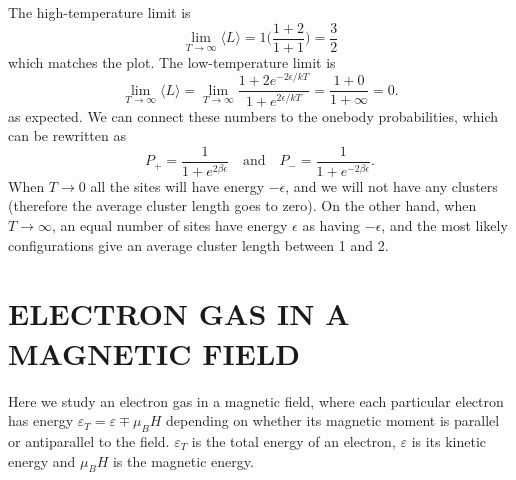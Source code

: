 \documentclass[norsk,a4paper,12pt]{article}
\begin{document}
The high-temperature limit is
\begin{equation}
\lim_{T\rightarrow\infty}\langle L\rangle = 1\bigg(\frac{1+2}{1+1}\bigg)=\frac{3}{2}
\end{equation}
which matches the plot. The low-temperature limit is
\begin{equation}
\lim_{T\rightarrow\infty}\langle L\rangle = \lim_{T\rightarrow\infty} \frac{1+2e^{-2\epsilon/kT}}{1+e^{2\epsilon/kT}}=\frac{1+0}{1+\infty}=0.
\end{equation}
as expected. We can connect these numbers to the onebody probabilities, which can be rewritten as
\begin{equation}
P_+=\frac{1}{1+e^{2\beta\epsilon}}\quad\text{and}\quad P_-=\frac{1}{1+e^{-2\beta\epsilon}}.
\end{equation}
When $T\rightarrow 0$ all the sites will have energy $-\epsilon$, and we will not have any clusters (therefore the average cluster length goes to zero). On the other hand, when $T\rightarrow\infty$, an equal number of sites have energy $\epsilon$ as having $-\epsilon$, and the most likely configurations give an average cluster length between 1 and 2.

\newpage
\section{ELECTRON GAS IN A MAGNETIC FIELD}
Here we study an electron gas in a magnetic field, where each particular electron has energy $\varepsilon_T=\varepsilon\mp\mu_BH$ depending on whether its magnetic moment is parallel or antiparallel to the field. $\varepsilon_T$ is the total energy of an electron, $\varepsilon$ is its kinetic energy and $\mu_BH$ is the magnetic energy. 
\end{document}
